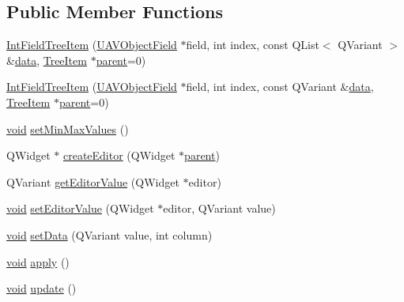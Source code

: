 \subsection*{\-Public \-Member \-Functions}
\begin{DoxyCompactItemize}
\item 
\hyperlink{group___u_a_v_object_browser_plugin_ga4ca34e25fd72802feaeb4123607bb7c4}{\-Int\-Field\-Tree\-Item} (\hyperlink{class_u_a_v_object_field}{\-U\-A\-V\-Object\-Field} $\ast$field, int index, const \-Q\-List$<$ \-Q\-Variant $>$ \&\hyperlink{group___u_a_v_object_browser_plugin_ga7c5708ae3cbba9c509f497c493beccb6}{data}, \hyperlink{class_tree_item}{\-Tree\-Item} $\ast$\hyperlink{group___u_a_v_object_browser_plugin_gaa3a7ba624312b6be70872634db291881}{parent}=0)
\item 
\hyperlink{group___u_a_v_object_browser_plugin_gab944da4a69d80c272ecb2cd56cb68a21}{\-Int\-Field\-Tree\-Item} (\hyperlink{class_u_a_v_object_field}{\-U\-A\-V\-Object\-Field} $\ast$field, int index, const \-Q\-Variant \&\hyperlink{group___u_a_v_object_browser_plugin_ga7c5708ae3cbba9c509f497c493beccb6}{data}, \hyperlink{class_tree_item}{\-Tree\-Item} $\ast$\hyperlink{group___u_a_v_object_browser_plugin_gaa3a7ba624312b6be70872634db291881}{parent}=0)
\item 
\hyperlink{group___u_a_v_objects_plugin_ga444cf2ff3f0ecbe028adce838d373f5c}{void} \hyperlink{group___u_a_v_object_browser_plugin_ga04070de761838b1f1df2c69a3b0c4529}{set\-Min\-Max\-Values} ()
\item 
\-Q\-Widget $\ast$ \hyperlink{group___u_a_v_object_browser_plugin_ga1ce7bba5d398e5db5afb25a1fdecc2cd}{create\-Editor} (\-Q\-Widget $\ast$\hyperlink{group___u_a_v_object_browser_plugin_gaa3a7ba624312b6be70872634db291881}{parent})
\item 
\-Q\-Variant \hyperlink{group___u_a_v_object_browser_plugin_ga1bfea485d5919a5c2548115597aa5644}{get\-Editor\-Value} (\-Q\-Widget $\ast$editor)
\item 
\hyperlink{group___u_a_v_objects_plugin_ga444cf2ff3f0ecbe028adce838d373f5c}{void} \hyperlink{group___u_a_v_object_browser_plugin_ga5c67d501056c61f098c9166f9e8bdef5}{set\-Editor\-Value} (\-Q\-Widget $\ast$editor, \-Q\-Variant value)
\item 
\hyperlink{group___u_a_v_objects_plugin_ga444cf2ff3f0ecbe028adce838d373f5c}{void} \hyperlink{group___u_a_v_object_browser_plugin_ga3a9f3c8507db3aeab86e7bfafd5ab91b}{set\-Data} (\-Q\-Variant value, int column)
\item 
\hyperlink{group___u_a_v_objects_plugin_ga444cf2ff3f0ecbe028adce838d373f5c}{void} \hyperlink{group___u_a_v_object_browser_plugin_ga24ca9e240126f614a138454ca00bd6b1}{apply} ()
\item 
\hyperlink{group___u_a_v_objects_plugin_ga444cf2ff3f0ecbe028adce838d373f5c}{void} \hyperlink{group___u_a_v_object_browser_plugin_ga8d58b6ded0f3e8c6d46cd4de99d0f061}{update} ()
\end{DoxyCompactItemize}


